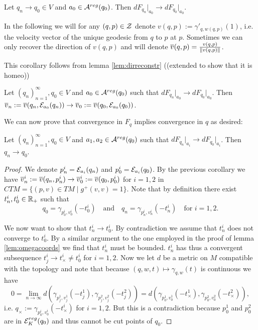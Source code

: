 \begin{corollary}\label{cor:dfpwconv}
    Let $q_n\to q_0\in V$ and $a_0\in {{\mathcal{A}}^{reg}}(q_0)$. Then $dF_{q_n}\rvert_{a_0} \to dF_{q_0}\rvert_{a_0}$.
\end{corollary}



In the following we will for any $(q,p)\in {\mathcal{Z}}$ denote $v(q,p):=\gamma'_{q,w(q,p)}(1)$, i.e. the velocity vector of the unique geodesic from $q$ to $p$ at $p$. Sometimes we can only recover the direction of $v(q,p)$ and will denote ${\overline{v}}(q,p) = \frac{v(q,p)}{\lVert v(q,p) \rVert}$.

This corollary follows from lemma \ref{lem:dirreconstr} ((extended to show that it is homeo))
\begin{corollary}\label{cor:dfconvimplpliesvconv}
    Let $(q_n)_{n=1}^\infty, q_0\in V$ and $a_0\in {{\mathcal{A}}^{reg}}(q_0)$ such that $dF_{q_n}\rvert_{a_0} \to dF_{q_0}\rvert_{a_0}$. Then ${\overline{v}}_n:={\overline{v}}(q_n,{\mathcal{E}}_{a_0}(q_n))\to {\overline{v}}_0:={\overline{v}}(q_0,{\mathcal{E}}_{a_0}(q_0))$.
\end{corollary}

We can now prove that convergence in $F_q$ implies convergence in $q$ as desired:
\begin{proposition}\label{prop:dfconvimplqconv}
    Let $(q_n)_{n=1}^\infty, q_0\in V$ and $a_1,a_2\in {{\mathcal{A}}^{reg}}(q_0)$ such that $dF_{q_n}\rvert_{a_i} \to dF_{q_0}\rvert_{a_i}$. Then $q_n \to q_0$.
\end{proposition}
\begin{proof}
    We denote $p_n^i = {\mathcal{E}}_{a_i}(q_n)$ and $p_0^i = {\mathcal{E}}_{a_i}(q_0)$.
    By the previous corollary we have ${\overline{v}}^i_n:={\overline{v}}(q_n,p_n^i)\to {\overline{v}}^i_0:={\overline{v}}(q_0,p_0^i)$ for $i=1,2$ in $CTM=\{(p,v)\in TM \mid g^+(v,v)=1\}$.
    Note that by definition there exist $t^i_n, t^i_0 \in \mathbb{R}_+$ such that 
    \[
        q_0 = \gamma_{p^i_0,v^i_0}(-t^i_0) \quad \text{and} \quad q_n = \gamma_{p^i_n,v^i_n}(-t^i_n) \quad \text{for }i = 1,2.
    \]

    We now want to show that $t^i_n\to t^i_0$. By contradiction we assume that $t^i_n$ does not converge to $t^i_0$. By a similar argument to the one employed in the proof of lemma \ref{lem:omegacoords} we find that $t^i_n$ must be bounded. $t^i_n$ has thus a convergent subsequence $t^i_j\to t^i_\times \neq t^i_0$ for $i=1,2$. Now we let $d$ be a metric on $M$ compatible with the topology and note that because $(q,w,t)\mapsto \gamma_{q,w}(t)$ is continuous we have
    \[
        0 = \lim_{n\to \infty} d(\gamma_{p^1_j,v^1_j}(-t^1_j),\gamma_{p^2_j,v^2_j}(-t^2_j)) = d(\gamma_{p^1_0,v^1_0}(-t^1_\times),\gamma_{p^2_0,v^2_0}(-t^2_\times)),
    \]i.e. $q_\times:=\gamma_{p^i_0,v^i_0}(-t^i_\times)$ for $i=1,2$. But this is a contradiction because $p^1_0$ and $p^2_0$ are in ${{\mathcal{E}}^{reg}_K}(q_0)$ and thus cannot be cut points of $q_0$.
\end{proof}

